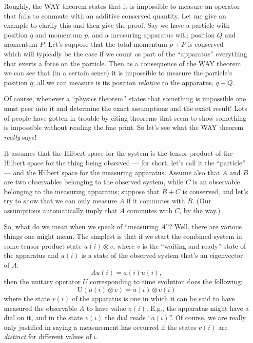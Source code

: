 \documentclass{article}
\begin{document}
Roughly, the WAY theorem states that it is impossible to measure an
operator that fails to commute with an additive conserved quantity. Let
me give an example to clarify this and then give the proof. Say we have
a particle with position \(q\) and momentum \(p\), and a measuring
apparatus with position \(Q\) and momentum \(P\). Let's suppose that the
total momentum \(p + P\) is conserved --- which will typically be the
case if we count as part of the ``apparatus'' everything that exerts a
force on the particle. Then as a consequence of the WAY theorem we can
see that (in a certain sense) it is impossible to measure the particle's
position \(q\); all we can measure is its position \emph{relative} to
the apparatus, \(q-Q\).

Of course, whenever a ``physics theorem'' states that something is
impossible one must peer into it and determine the exact assumptions and
the exact result! Lots of people have gotten in trouble by citing
theorems that seem to show something is impossible without reading the
fine print. So let's see what the WAY theorem \emph{really} says!

It assumes that the Hilbert space for the system is the tensor product
of the Hilbert space for the thing being observed --- for short, let's
call it the ``particle'' --- and the Hilbert space for the measuring
apparatus. Assume also that \(A\) and \(B\) are two observables
belonging to the observed system, while \(C\) is an observable belonging
to the measuring apparatus; suppose that \(B + C\) is conserved, and
let's try to show that we can only measure \(A\) if it commutes with
\(B\). (Our assumptions automatically imply that \(A\) commutes with
\(C\), by the way.)

So, what do we mean when we speak of ``measuring \(A\)''? Well, there
are various things one might mean. The simplest is that if we start the
combined system in some tensor product state \(u(i) \otimes v\), where
\(v\) is the ``waiting and ready'' state of the apparatus and \(u(i)\)
is a state of the observed system that's an eigenvector of \(A\):
\[Au(i) = a(i)u(i),\] then the unitary operator \(U\) corresponding to
time evolution does the following:
\[\mathrm{U}(u(i) \otimes v) = u(i) \otimes v(i)\] where the state
\(v(i)\) of the apparatus is one in which it can be said to have
measured the observable \(A\) to have value \(a(i)\). E.g., the
apparatus might have a dial on it, and in the state \(v(i)\) the dial
reads ``\(a(i)\)''. Of course, we are really only justified in saying a
measurement has occurred if the states \(v(i)\) are \emph{distinct} for
different values of \(i\).
\end{document}
